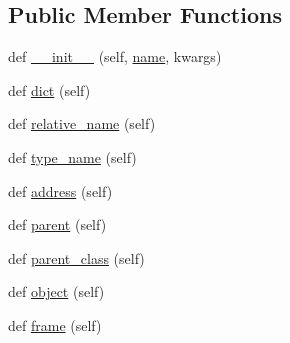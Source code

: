 \subsection*{Public Member Functions}
\begin{DoxyCompactItemize}
\item 
def \hyperlink{classmemoryoracle_1_1descriptions_1_1InstanceDescription_ab7b0e3b12b610b1631e9b670782b2ef0}{\+\_\+\+\_\+init\+\_\+\+\_\+} (self, \hyperlink{classmemoryoracle_1_1descriptions_1_1Description_a4b27c3ae1ef0ab35ec0f990fa553b8b3}{name}, kwargs)
\item 
def \hyperlink{classmemoryoracle_1_1descriptions_1_1InstanceDescription_a0ba4007e81ba87422e62d3e12605b0e3}{dict} (self)
\item 
def \hyperlink{classmemoryoracle_1_1descriptions_1_1InstanceDescription_a49950c909c787c4f15e03a68fc735e67}{relative\+\_\+name} (self)
\item 
def \hyperlink{classmemoryoracle_1_1descriptions_1_1InstanceDescription_a00ece7638600104272d5db98854b4ea8}{type\+\_\+name} (self)
\item 
def \hyperlink{classmemoryoracle_1_1descriptions_1_1InstanceDescription_a5d076a714ce9bbe8ada5cd41e9e5d043}{address} (self)
\item 
def \hyperlink{classmemoryoracle_1_1descriptions_1_1InstanceDescription_ab2aa339c8bcd34607651813e63d90000}{parent} (self)
\item 
def \hyperlink{classmemoryoracle_1_1descriptions_1_1InstanceDescription_af22d43a4a2cb46e9f9aa92540cb0e937}{parent\+\_\+class} (self)
\item 
def \hyperlink{classmemoryoracle_1_1descriptions_1_1InstanceDescription_a1f771d354e77a6725cc27559c8bfb52d}{object} (self)
\item 
def \hyperlink{classmemoryoracle_1_1descriptions_1_1InstanceDescription_ac4d8f16a2b5761e93508cb4ff73b654c}{frame} (self)
\end{DoxyCompactItemize}
